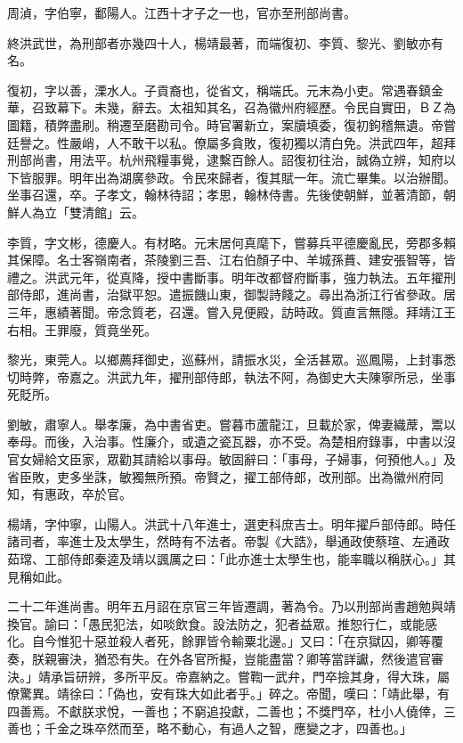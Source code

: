 \begin{pinyinscope}
周湞，字伯寧，鄱陽人。江西十才子之一也，官亦至刑部尚書。

終洪武世，為刑部者亦幾四十人，楊靖最著，而端復初、李質、黎光、劉敏亦有名。

復初，字以善，溧水人。子貢裔也，從省文，稱端氏。元末為小吏。常遇春鎮金華，召致幕下。未幾，辭去。太祖知其名，召為徽州府經歷。令民自實田，ＢＺ為圖籍，積弊盡刷。稍遷至磨勘司令。時官署新立，案牘填委，復初鉤稽無遺。帝嘗廷譽之。性嚴峭，人不敢干以私。僚屬多貪敗，復初獨以清白免。洪武四年，超拜刑部尚書，用法平。杭州飛糧事覺，逮繫百餘人。詔復初往治，誠偽立辨，知府以下皆服罪。明年出為湖廣參政。令民來歸者，復其賦一年。流亡畢集。以治辦聞。坐事召還，卒。子孝文，翰林待詔；孝思，翰林侍書。先後使朝鮮，並著清節，朝鮮人為立「雙清館」云。

李質，字文彬，德慶人。有材略。元末居何真麾下，嘗募兵平德慶亂民，旁郡多賴其保障。名士客嶺南者，茶陵劉三吾、江右伯顏子中、羊城孫蕡、建安張智等，皆禮之。洪武元年，從真降，授中書斷事。明年改都督府斷事，強力執法。五年擢刑部侍郎，進尚書，治獄平恕。遣振饑山東，御製詩餞之。尋出為浙江行省參政。居三年，惠績著聞。帝念質老，召還。嘗入見便殿，訪時政。質直言無隱。拜靖江王右相。王罪廢，質竟坐死。

黎光，東莞人。以鄉薦拜御史，巡蘇州，請振水災，全活甚眾。巡鳳陽，上封事悉切時弊，帝嘉之。洪武九年，擢刑部侍郎，執法不阿，為御史大夫陳寧所忌，坐事死貶所。

劉敏，肅寧人。舉孝廉，為中書省吏。嘗暮市蘆龍江，旦載於家，俾妻織蓆，鬻以奉母。而後，入治事。性廉介，或遺之瓷瓦器，亦不受。為楚相府錄事，中書以沒官女婦給文臣家，眾勸其請給以事母。敏固辭曰：「事母，子婦事，何預他人。」及省臣敗，吏多坐誅，敏獨無所預。帝賢之，擢工部侍郎，改刑部。出為徽州府同知，有惠政，卒於官。

楊靖，字仲寧，山陽人。洪武十八年進士，選吏科庶吉士。明年擢戶部侍郎。時任諸司者，率進士及太學生，然時有不法者。帝製《大誥》，舉通政使蔡瑄、左通政茹瑺、工部侍郎秦逵及靖以諷厲之曰：「此亦進士太學生也，能率職以稱朕心。」其見稱如此。

二十二年進尚書。明年五月詔在京官三年皆遷調，著為令。乃以刑部尚書趙勉與靖換官。諭曰：「愚民犯法，如啖飲食。設法防之，犯者益眾。推恕行仁，或能感化。自今惟犯十惡並殺人者死，餘罪皆令輸粟北邊。」又曰：「在京獄囚，卿等覆奏，朕親審決，猶恐有失。在外各官所擬，豈能盡當？卿等當詳讞，然後遣官審決。」靖承旨研辨，多所平反。帝嘉納之。嘗鞫一武弁，門卒撿其身，得大珠，屬僚驚異。靖徐曰：「偽也，安有珠大如此者乎。」碎之。帝聞，嘆曰：「靖此舉，有四善焉。不獻朕求悅，一善也；不窮追投獻，二善也；不獎門卒，杜小人僥倖，三善也；千金之珠卒然而至，略不動心，有過人之智，應變之才，四善也。」


\end{pinyinscope}
